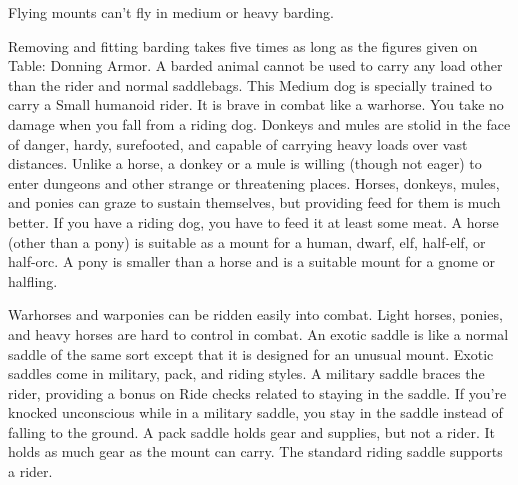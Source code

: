 \par Flying mounts can't fly in medium or heavy barding.
\par Removing and fitting barding takes five times as long as the figures given on Table: Donning Armor. A barded animal cannot be used to carry any load other than the rider and normal saddlebags.
 This Medium dog is specially trained to carry a Small humanoid rider. It is brave in combat like a warhorse. You take no damage when you fall from a riding dog.
 Donkeys and mules are stolid in the face of danger, hardy, surefooted, and capable of carrying heavy loads over vast distances. Unlike a horse, a donkey or a mule is willing (though not eager) to enter dungeons and other strange or threatening places.
 Horses, donkeys, mules, and ponies can graze to sustain themselves, but providing feed for them is much better. If you have a riding dog, you have to feed it at least some meat.
 A horse (other than a pony) is suitable as a mount for a human, dwarf, elf, half-elf, or half-orc. A pony is smaller than a horse and is a suitable mount for a gnome or halfling.
\par Warhorses and warponies can be ridden easily into combat. Light horses, ponies, and heavy horses are hard to control in combat.
 An exotic saddle is like a normal saddle of the same sort except that it is designed for an unusual mount. Exotic saddles come in military, pack, and riding styles.
 A military saddle braces the rider, providing a  bonus on Ride checks related to staying in the saddle. If you're knocked unconscious while in a military saddle, you stay in the saddle instead of falling to the ground.
 A pack saddle holds gear and supplies, but not a rider. It holds as much gear as the mount can carry.
 The standard riding saddle supports a rider.

